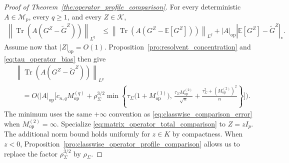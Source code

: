\documentclass[EJP, preprint, NODS, nobera, nofontexpansion]{ejpecp}
\DeclareMathOperator{\op}{op}
\DeclareMathOperator{\tr}{Tr}
\begin{document}
\begin{proof}[Proof of Theorem~\ref{the:operator_profile_comparison}]
For every deterministic \(A\in\mathcal M_p\), every \(q\geq1\), and
every \(Z\in\mathcal K\),
\begin{align*}
    \left\|
        \tr\!\left(
            A(G^Z-\widetilde G^Z)
        \right)
    \right\|_{L^q}
    &\leq
    \left\|
        \tr\!\left(
            A(G^Z-\mathbb E[G^Z])
        \right)
    \right\|_{L^q}
    +
    |A|_{\op}
    |\mathbb E[G^Z]-\widetilde G^Z|_*.
\end{align*}
Assume now that \(|Z|_{\op}=O(1)\).
Proposition~\ref{pro:resolvent_concentration} and
\eqref{eq:tau_operator_bias} then give
\begin{align}
\label{eq:matrix_operator_total_comparison}
&\left\|
    \tr\!\left(
        A(G^Z-\widetilde G^Z)
    \right)
\right\|_{L^q}
\nonumber\\
&\quad=
O\!\Biggl(
    |A|_{\op}
    \Biggl[
        c_{n,q}M_{\op}^{(q)}
        +
        \rho_\Sigma^{3/2}
        \min\left\{
            \tau_\Sigma\bigl(1+M_{\op}^{(1)}\bigr),
            \,
            \frac{\tau_\Sigma M_{\op}^{(2)}}{\sqrt n}
            +
            \frac{
                \tau_\Sigma^2+(M_{\op}^{(2)})^2
            }{n}
        \right\}
    \Biggr]
\Biggr).
\end{align}
The minimum uses the same $+\infty$ convention as
\eqref{eq:classwise_comparison_error} when
$M_{\op}^{(2)}=\infty$.
Specialize \eqref{eq:matrix_operator_total_comparison} to
\(Z=zI_p\). The additional norm bound holds uniformly for $z\in K$
by compactness. 
When \(z<0\), Proposition~\ref{pro:classwise_operator_profile_comparison} allows us to replace the factor
\(\rho_\Sigma^{3/2}\) by \(\rho_\Sigma\).
\end{proof}
\end{document}
